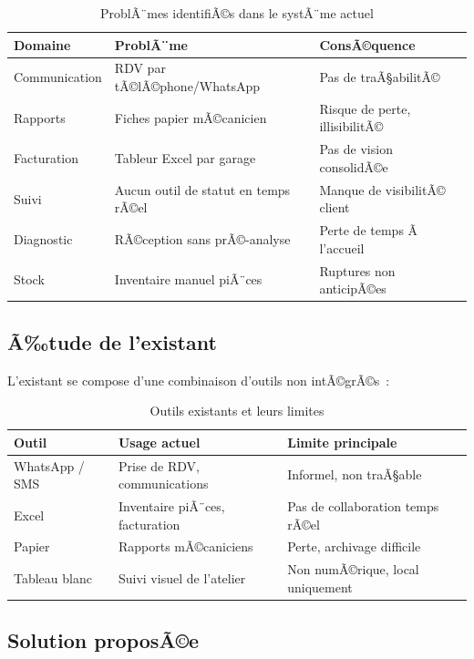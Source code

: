 \begin{table}[H]
\centering
\begin{tabularx}{\textwidth}{|l|X|X|}
\hline
\rowcolor{gray!20}
\textbf{Domaine} & \textbf{ProblÃ¨me} & \textbf{ConsÃ©quence} \\
\hline
Communication & RDV par tÃ©lÃ©phone/WhatsApp & Pas de traÃ§abilitÃ© \\
\hline
Rapports & Fiches papier mÃ©canicien & Risque de perte, illisibilitÃ© \\
\hline
Facturation & Tableur Excel par garage & Pas de vision consolidÃ©e \\
\hline
Suivi & Aucun outil de statut en temps rÃ©el & Manque de visibilitÃ© client \\
\hline
Diagnostic & RÃ©ception sans prÃ©-analyse & Perte de temps Ã  l'accueil \\
\hline
Stock & Inventaire manuel piÃ¨ces & Ruptures non anticipÃ©es \\
\hline
\end{tabularx}
\caption{ProblÃ¨mes identifiÃ©s dans le systÃ¨me actuel}
\label{tab:problemes}
\end{table}

\subsection{Ã‰tude de l'existant}

L'existant se compose d'une combinaison d'outils non intÃ©grÃ©s~:

\begin{table}[H]
\centering
\begin{tabularx}{\textwidth}{|l|X|X|}
\hline
\rowcolor{gray!20}
\textbf{Outil} & \textbf{Usage actuel} & \textbf{Limite principale} \\
\hline
WhatsApp / SMS & Prise de RDV, communications & Informel, non traÃ§able \\
\hline
Excel & Inventaire piÃ¨ces, facturation & Pas de collaboration temps rÃ©el \\
\hline
Papier & Rapports mÃ©caniciens & Perte, archivage difficile \\
\hline
Tableau blanc & Suivi visuel de l'atelier & Non numÃ©rique, local uniquement \\
\hline
\end{tabularx}
\caption{Outils existants et leurs limites}
\label{tab:existant}
\end{table}

\subsection{Solution proposÃ©e}

